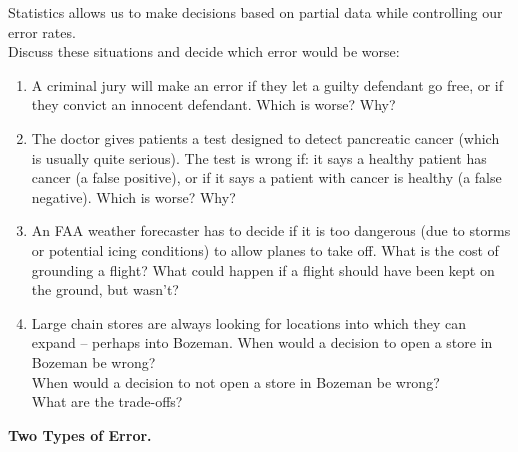 Statistics allows us to make decisions based on partial data  while
controlling our error rates.\\
Discuss these situations and decide which error would be worse:\vspace{-.6cm}
\begin{enumerate}
\item A criminal jury will make an error if
      they let a guilty defendant go free, or if
      they convict an innocent defendant.
     Which is worse? Why?
\begin{students}
  \vspace{1.5cm}
\end{students}

\item The doctor gives patients a test designed to detect pancreatic
  cancer (which is usually quite serious).  The test is wrong if:
  it says a healthy patient has cancer (a false positive), or if
  it says a patient with cancer is healthy (a false negative).  Which
  is worse?  Why? 
\begin{students}
  \vspace{1.5cm}
\end{students}

\item  An FAA weather forecaster has to decide if it is too dangerous
   (due to storms or potential icing conditions) to allow planes to
   take off.  What is the cost of grounding a flight? What could
   happen if a flight should have been kept on the ground, but wasn't?  
\begin{students}
  \vspace{2.5cm}
\end{students}



\item  Large chain stores are always looking for locations into which
  they can expand -- perhaps into Bozeman. 
  When would a  decision to open a store in Bozeman  be wrong?\\
  When would a decision to not open a store in Bozeman  be
  wrong?\\
  What are the trade-offs?  
\begin{students}
  \vspace{3cm}
\end{students}

\end{enumerate}

{\bf Two Types of Error. }

